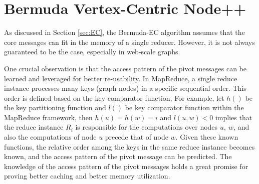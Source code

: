 \section{Bermuda Vertex-Centric Node++} 
As discussed in Section \ref{sec:EC}, the Bermuda-EC algorithm assumes that the core messages can fit in the memory of a single reducer. However, it is not always guaranteed to be the case, especially in web-scale graphs.

One crucial observation is that the access pattern of the pivot messages
can be learned and leveraged for better re-usability. 
In MapReduce, a single reduce instance processes many keys (graph nodes) in a specific sequential order. This order is defined based on the key comparator function. 
For example, let $h()$ be the key partitioning function and $l()$ be key comparator function within the MapReduce framework, 
then $h(u)=h(w)=i$ and $l(u,w)<0$ implies that the reduce instance $R_i$ is responsible for the computations over nodes $u,~w$, and also the computations 
of node $u$ precede   that of node $w$. 
Given these known functions, the relative order among the keys in the same reduce instance becomes known,
 and the access pattern of  the pivot message can be predicted. 
The knowledge of the access pattern of the pivot messages holds a great promise for proving better caching and better memory utilization.

